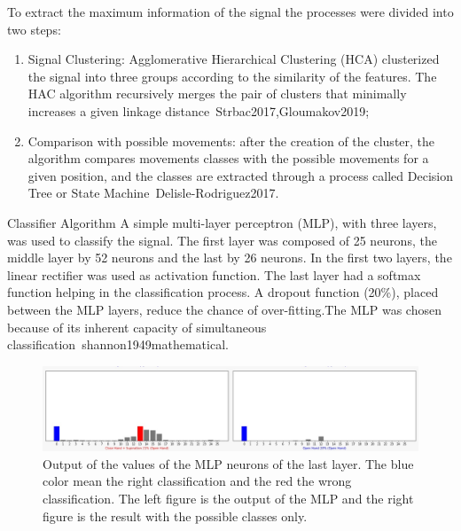 \documentclass[a4paper, 12pt]{ppgeb}
\makeatletter
\renewcommand{\subsection}{\@startsection
{subsection}
{2}
{0mm}
{-\baselineskip}
{0.5\baselineskip}
{\bf\sffamily}}
\makeatother
\begin{document}
To extract the maximum information of the signal the processes were divided into two steps:

\begin{enumerate}
	\item Signal Clustering: Agglomerative Hierarchical Clustering (\ac{HCA}) clusterized the signal into three groups according to the similarity of the features. The HAC algorithm recursively merges the pair of clusters that minimally increases a given linkage distance~\cite{mainreferences}{Strbac2017,Gloumakov2019};
	\item Comparison with possible movements: after the creation of the cluster, the algorithm compares movements classes with the possible movements for a given position, and the classes are extracted through a process called Decision Tree or State Machine~\cite{mainreferences}{Delisle-Rodriguez2017}.
\end{enumerate}

\subsection{Classifier Algorithm}
A simple multi-layer perceptron (\ac{MLP}), with three layers, was used to classify the signal. The first layer was composed of 25 neurons, the middle layer by 52 neurons and the last by 26 neurons. In the first two layers, the linear rectifier was used as activation function. The last layer had a softmax function helping in the classification process. A dropout function (20\%), placed between the \ac{MLP} layers, reduce the chance of over-fitting.The \ac{MLP} was chosen because of its inherent capacity of simultaneous classification~\cite{mainreferences}{shannon1949mathematical}.

\begin{figure}[h]
    \begin{center}
	\includegraphics[width=.8\linewidth]{output.png}
	\end{center}
	\caption{Output of the values of the \ac{MLP} neurons of the last layer. The blue color mean the right classification and the red the wrong classification. The left figure is the output of the \ac{MLP} and the right figure is the result with the possible classes only.} \label{final_classification}
\end{figure}
\end{document}
